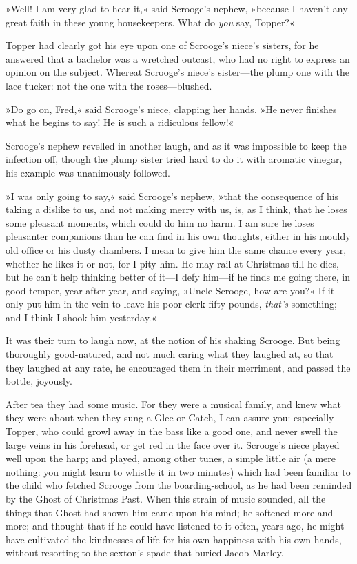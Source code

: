 »Well! I am very glad to hear it,« said Scrooge's nephew, »because I haven't any great faith in these young housekeepers. What do \textit{you} say, Topper?«

Topper had clearly got his eye upon one of Scrooge's niece's sisters, for he answered that a bachelor was a wretched outcast, who had no right to express an opinion on the subject. Whereat Scrooge's niece's sister—the plump one with the lace tucker: not the one with the roses—blushed.

»Do go on, Fred,« said Scrooge's niece, clapping her hands. »He never finishes what he begins to say! He is such a ridiculous fellow!«

Scrooge's nephew revelled in another laugh, and as it was impossible to keep the infection off, though the plump sister tried hard to do it with aromatic vinegar, his example was unanimously followed.

»I was only going to say,« said Scrooge's nephew, »that the consequence of his taking a dislike to us, and not making merry with us, is, as I think, that he loses some pleasant moments, which could do him no harm. I am sure he loses pleasanter companions than he can find in his own thoughts, either in his mouldy old office or his dusty chambers. I mean to give him the same chance every year, whether he likes it or not, for I pity him. He may rail at Christmas till he dies, but he can't help thinking better of it—I defy him—if he finds me going there, in good temper, year after year, and saying, »Uncle Scrooge, how are you?« If it only put him in the vein to leave his poor clerk fifty pounds, \textit{that's} something; and I think I shook him yesterday.«

It was their turn to laugh now, at the notion of his shaking Scrooge. But being thoroughly good-natured, and not much car\-ing what they laughed at, so that they laughed at any rate, he encouraged them in their merriment, and passed the bottle, joyously.

After tea they had some music. For they were a musical family, and knew what they were about when they sung a Glee or Catch, I can assure you: especially Topper, who could growl away in the bass like a good one, and never swell the large veins in his forehead, or get red in the face over it. Scrooge's niece played well upon the harp; and played, among other tunes, a simple little air (a mere nothing: you might learn to whistle it in two minutes) which had been familiar to the child who fetched Scrooge from the boarding-school, as he had been reminded by the Ghost of Christmas Past. When this strain of music sounded, all the things that Ghost had shown him came upon his mind; he softened more and more; and thought that if he could have listened to it often, years ago, he might have cultivated the kindnesses of life for his own happiness with his own hands, without resorting to the sexton's spade that buried Jacob Marley.

